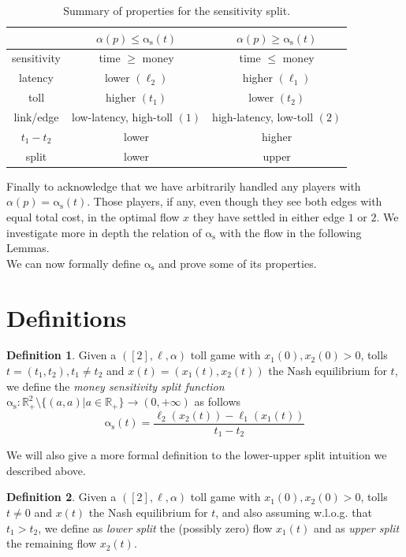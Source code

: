 \documentclass[10pt,a4paper]{book}
\newcommand{\as}{\mathrm{\alpha_s}}
\newcommand{\R}{\mathbb{R}}
\theoremstyle{definition}
\newtheorem{definition}{Definition}[chapter]
\theoremstyle{comment}
\begin{document}
\begin{table}[h!]
	\centering
	\caption{Summary of properties for the sensitivity split.}
	\begin{tabular}{| c || c | c |}
		\hline
		& $\alpha(p) \le \as(t)$ & $\alpha(p) \ge \as(t)$ \\ \hline
		sensitivity & time $\ge$ money & time $\le$ money \\ \hline
		latency & lower $(\ell_2)$ & higher $(\ell_1)$ \\ \hline
		toll & higher $(t_1)$ & lower $(t_2)$ \\ \hline
		link/edge & low-latency, high-toll $(1)$ & high-latency, low-toll $(2)$ \\ \hline
		$t_1 - t_2$ & lower & higher \\ \hline
		split & lower & upper \\ \hline
	\end{tabular}
	\label{table:split_summary}
\end{table}

Finally to acknowledge that we have arbitrarily handled any players with $\alpha(p) = \as(t)$.
Those players, if any, even though they see both edges with equal total cost, in the optimal flow $x$ they have settled in either edge $1$ or $2$.
We investigate more in depth the relation of $\as$ with the flow in the following Lemmas.
\\[12pt]
We can now formally define $\as$ and prove some of its properties.

\section{Definitions}

\begin{definition}
	\label{definition:split_function}
	Given a $([2], \ell, \alpha)$ toll game with $x_1(0), x_2(0) > 0$, tolls $t = (t_1, t_2), t_1 \ne t_2$ and $x(t) = (x_1(t), x_2(t))$ the Nash equilibrium for $t$, we define the \textit{money sensitivity split function} $\as: \R_+^2 \setminus \{(a, a) | a \in \R_+\} \rightarrow (0, +\infty)$ as follows 
	\[\as(t) = \frac{\ell_2(x_2(t)) - \ell_1(x_1(t))}{t_1 - t_2}\]
\end{definition}

We will also give a more formal definition to the lower-upper split intuition we described above.
\begin{definition}
	\label{definition:split_lower_upper}
	Given a $([2], \ell, \alpha)$ toll game with $x_1(0), x_2(0) > 0$, tolls $t \ne 0$ and $x(t)$ the Nash equilibrium for $t$, and also assuming w.l.o.g. that $t_1 > t_2$, we define as \textit{lower split} the (possibly zero) flow $x_1(t)$ and as \textit{upper split} the remaining flow $x_2(t)$. 
\end{definition}
\end{document}
